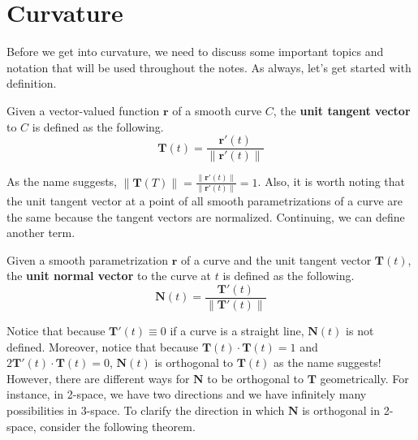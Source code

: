 \documentclass[../../../main.tex]{subfiles}
\begin{document}
\section{Curvature}

Before we get into curvature, we need to discuss some important
topics and notation that will be used throughout the notes.
As always, let's get started with definition.

\begin{definition}{}{}
Given a vector-valued function $\mathbf{r}$ of a smooth curve $C$,
the \textbf{unit tangent vector} to $C$ is defined as the following.
\[
\mathbf{T}(t) = \frac{\mathbf{r}'(t)}{\| \mathbf{r}'(t) \|}
\]
\end{definition}

As the name suggests, $\| \mathbf{T}(T) \| =
\frac{\| \mathbf{r}'(t) \|}{\| \mathbf{r}'(t) \|} = 1$. Also, it is
worth noting that the unit tangent vector at a point of all smooth
parametrizations of a curve are the same because the tangent vectors
are normalized. Continuing, we can define another term.

\begin{definition}{}{}
Given a smooth parametrization $\mathbf{r}$ of a curve and the unit
tangent vector $\mathbf{T}(t)$, the \textbf{unit normal vector} to
the curve at $t$ is defined as the following.
\[
\mathbf{N}(t) = \frac{\mathbf{T}'(t)}{\| \mathbf{T}'(t) \|}
\]
\end{definition}

Notice that because $\mathbf{T}'(t) \equiv 0$ if a curve is a
straight line, $\mathbf{N}(t)$ is not defined. Moreover, notice that
because $\mathbf{T}(t) \cdot \mathbf{T}(t) = 1$ and $2\mathbf{T}'(t)
\cdot \mathbf{T}(t) = 0$, $\mathbf{N}(t)$ is orthogonal to
$\mathbf{T}(t)$ as the name suggests! However, there are different
ways for $\mathbf{N}$ to be orthogonal to $\mathbf{T}$ geometrically.
For instance, in 2-space, we have two directions and we have
infinitely many possibilities in 3-space. To clarify the direction
in which $\mathbf{N}$ is orthogonal in 2-space, consider the
following theorem.
\end{document}
